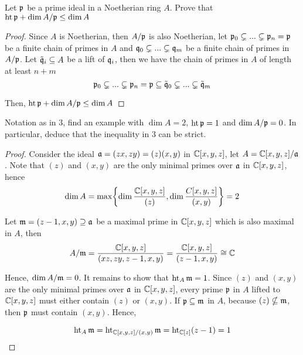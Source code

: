 \begin{problem}
	Let $\mathfrak{p}$ be a prime ideal in a Noetherian ring $A$. Prove that $\operatorname{ht} \mathfrak{p} + \dim A / \mathfrak{p} \leq \dim A$
\end{problem}

\begin{proof}
	Since $A$ is Noetherian, then $A / \mathfrak{p}$ is also Noetherian, let $\mathfrak{p}_0 \subsetneq ... \subsetneq \mathfrak{p}_n = \mathfrak{p}$ be a finite chain of primes in $A$ and $\mathfrak{q}_0 \subsetneq ... \subsetneq \mathfrak{q}_m$ be a finite chain of primes in $A / \mathfrak{p}$. Let $\tilde{\mathfrak{q}}_i \subseteq A$ be a lift of $\mathfrak{q}_i$, then we have the chain of primes in $A$ of length at least $n + m$
	$$
		\mathfrak{p}_0 \subsetneq ... \subsetneq \mathfrak{p}_n = \mathfrak{p} \subseteq \tilde{\mathfrak{q}}_0 \subsetneq ... \subsetneq \tilde{\mathfrak{q}}_m
	$$
	
	Then, $\operatorname{ht} \mathfrak{p} + \dim A / \mathfrak{p} \leq \dim A$
\end{proof}

\begin{problem}
	Notation as in $3$, find an example with $\dim A = 2$, $\operatorname{ht} \mathfrak{p}  = 1$ and $\dim A / \mathfrak{p} = 0$. In particular, deduce that the inequality in $3$ can be strict.
\end{problem}

\begin{proof}	
	Consider the ideal $\mathfrak{a} = (zx, zy) = (z) (x, y)$ in $\mathbb{C}[x, y, z]$, let $A = \mathbb{C}[x, y, z] / \mathfrak{a}$. Note that $(z)$ and $(x, y)$ are the only minimal primes over $\mathfrak{a}$ in $\mathbb{C}[x, y, z]$, hence
	$$
		\dim A = \max \set*{\dim \frac{\C[x, y, z]}{(z)}, \dim \frac{C[x, y, z]}{(x, y)}} = 2
	$$
	
	Let $\mathfrak{m} = (z-1, x, y) \supseteq \mathfrak{a}$ be a maximal prime in $\mathbb{C}[x, y, z]$ which is also maximal in $A$, then
	$$
		A / \mathfrak{m} = \frac{\mathbb{C}[x, y, z]}{(xz, zy, z-1, x, y)} = \frac{\mathbb{C}[x, y, z]}{(z-1, x, y)} \cong \mathbb{C}
	$$
	
	Hence, $\dim A / \mathfrak{m} = 0$. It remains to show that $\operatorname{ht}_A \mathfrak{m} = 1$. Since $(z)$ and $(x, y)$ are the only minimal primes over $\mathfrak{a}$ in $\mathbb{C}[x, y, z]$, every prime $\mathfrak{p}$ in $A$ lifted to $\mathbb{C}[x, y, z]$ must either contain $(z)$ or $(x, y)$. If $\mathfrak{p} \subseteq \mathfrak{m}$ in $A$, because $(z) \nsubseteq \mathfrak{m}$, then $\mathfrak{p}$ must contain $(x, y)$. Hence, 
	
	$$
		\operatorname{ht}_A \mathfrak{m} = \operatorname{ht}_{\mathbb{C}[x, y, z] / (x, y)} \mathfrak{m} = \operatorname{ht}_{\mathbb{C}[z]} (z-1) = 1
	$$
\end{proof} 

